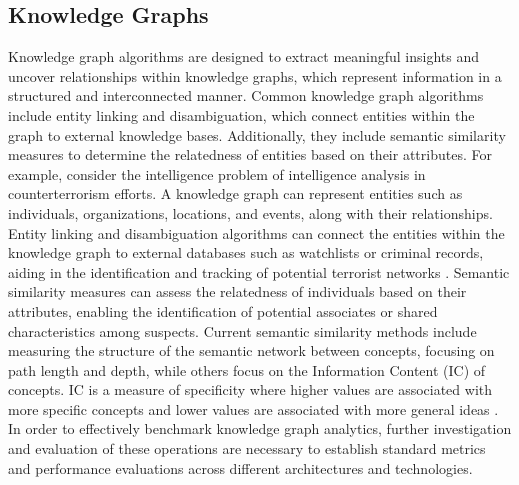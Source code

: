 \documentclass[letterpaper, 10pt]{article}
\begin{document}
\begin{multicols}{2}
{        \subsection{Knowledge Graphs}\label{section:knowledgeGraphs}
            Knowledge graph algorithms are designed to extract meaningful insights and uncover relationships within knowledge graphs, which represent information in a structured and interconnected manner.
            Common knowledge graph algorithms include entity linking and disambiguation, which connect entities within the graph to external knowledge bases. 
            Additionally, they include semantic similarity measures to determine the relatedness of entities based on their attributes.
            For example, consider the intelligence problem of intelligence analysis in counterterrorism efforts. 
            A knowledge graph can represent entities such as individuals, organizations, locations, and events, along with their relationships. 
            Entity linking and disambiguation algorithms can connect the entities within the knowledge graph to external databases such as watchlists or criminal records, aiding in the identification and tracking of potential terrorist networks \cite{Xia2019}. 
            Semantic similarity measures can assess the relatedness of individuals based on their attributes, enabling the identification of potential associates or shared characteristics among suspects. Current semantic similarity methods include  measuring the structure of the semantic network between concepts, focusing on path length and depth, while others focus on the Information Content (IC) of concepts. IC is a measure of specificity where higher values are associated with more specific concepts and lower values are associated with more general ideas \cite{Zhu2016}. In order to effectively benchmark knowledge graph analytics, further investigation and evaluation of these operations are necessary to establish standard metrics and performance evaluations across different architectures and technologies.
            
}
\end{multicols}
\end{document}
